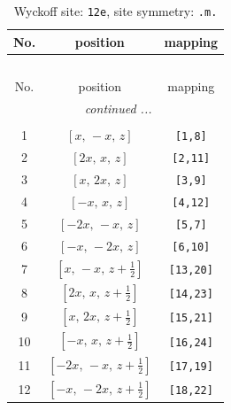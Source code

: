 \documentclass[fleqn,8pt]{jsarticle}
\begin{document}
\begin{longtable}{ccc}
\caption{Wyckoff site: {\tt 12e}, site symmetry: {\tt .m.}}
 \\
 \hline \hline
No. & position & mapping \\ \hline \endfirsthead

\multicolumn{2}{l}{\tablename\ \thetable{}} \\
 \hline \hline
No. & position & mapping \\ \hline \endhead

 \hline \hline
\multicolumn{2}{r}{\footnotesize\it continued ...} \\ \endfoot

 \hline \hline
\multicolumn{2}{r}{} \\ \endlastfoot

1 & $\left[ x,\, - x,\, z \right]$ & {\tt [1,8]} \\ \hline
2 & $\left[ 2 x,\, x,\, z \right]$ & {\tt [2,11]} \\ \hline
3 & $\left[ x,\, 2 x,\, z \right]$ & {\tt [3,9]} \\ \hline
4 & $\left[ - x,\, x,\, z \right]$ & {\tt [4,12]} \\ \hline
5 & $\left[ - 2 x,\, - x,\, z \right]$ & {\tt [5,7]} \\ \hline
6 & $\left[ - x,\, - 2 x,\, z \right]$ & {\tt [6,10]} \\ \hline
7 & $\left[ x,\, - x,\, z + \frac{1}{2} \right]$ & {\tt [13,20]} \\ \hline
8 & $\left[ 2 x,\, x,\, z + \frac{1}{2} \right]$ & {\tt [14,23]} \\ \hline
9 & $\left[ x,\, 2 x,\, z + \frac{1}{2} \right]$ & {\tt [15,21]} \\ \hline
10 & $\left[ - x,\, x,\, z + \frac{1}{2} \right]$ & {\tt [16,24]} \\ \hline
11 & $\left[ - 2 x,\, - x,\, z + \frac{1}{2} \right]$ & {\tt [17,19]} \\ \hline
12 & $\left[ - x,\, - 2 x,\, z + \frac{1}{2} \right]$ & {\tt [18,22]} \\
\end{longtable}
\renewcommand{\arraystretch}{1.2}
\end{document}
